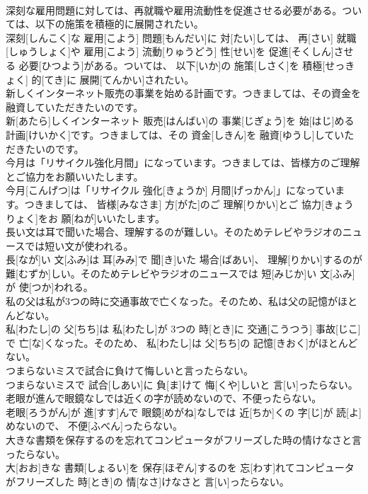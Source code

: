 \documentclass[8pt]{extreport}
\begin{document}
\begin{CJK}{UTF8}{min}
\\	深刻な雇用問題に対しては、再就職や雇用流動性を促進させる必要がある。ついては、以下の施策を積極的に展開されたい。	
\\	深刻[しんこく]な 雇用[こよう] 問題[もんだい]に 対[たい]しては、 再[さい] 就職[しゅうしょく]や 雇用[こよう] 流動[りゅうどう] 性[せい]を 促進[そくしん]させる 必要[ひつよう]がある。ついては、 以下[いか]の 施策[しさく]を 積極[せっきょく] 的[てき]に 展開[てんかい]されたい。
\\	新しくインターネット販売の事業を始める計画です。つきましては、その資金を融資していただきたいのです。	
\\	新[あたら]しくインターネット 販売[はんばい]の 事業[じぎょう]を 始[はじ]める 計画[けいかく]です。つきましては、その 資金[しきん]を 融資[ゆうし]していただきたいのです。
\\	今月は「リサイクル強化月間」になっています。つきましては、皆様方のご理解とご協力をお願いいたします。	
\\	今月[こんげつ]は「リサイクル 強化[きょうか] 月間[げっかん]」になっています。つきましては、 皆様[みなさま] 方[がた]のご 理解[りかい]とご 協力[きょうりょく]をお 願[ねが]いいたします。
\\	長い文は耳で聞いた場合、理解するのが難しい。そのためテレビやラジオのニュースでは短い文が使われる。	
\\	長[なが]い 文[ふみ]は 耳[みみ]で 聞[き]いた 場合[ばあい]、 理解[りかい]するのが 難[むずか]しい。そのためテレビやラジオのニュースでは 短[みじか]い 文[ふみ]が 使[つか]われる。
\\	私の父は私が3つの時に交通事故で亡くなった。そのため、私は父の記憶がほとんどない。	
\\	私[わたし]の 父[ちち]は 私[わたし]が 3つの 時[とき]に 交通[こうつう] 事故[じこ]で 亡[な]くなった。そのため、 私[わたし]は 父[ちち]の 記憶[きおく]がほとんどない。
\\	つまらないミスで試合に負けて悔しいと言ったらない。	
\\	つまらないミスで 試合[しあい]に 負[ま]けて 悔[くや]しいと 言[い]ったらない。
\\	老眼が進んで眼鏡なしでは近くの字が読めないので、不便ったらない。	
\\	老眼[ろうがん]が 進[すす]んで 眼鏡[めがね]なしでは 近[ちか]くの 字[じ]が 読[よ]めないので、 不便[ふべん]ったらない。
\\	大きな書類を保存するのを忘れてコンピュータがフリーズした時の情けなさと言ったらない。	
\\	大[おお]きな 書類[しょるい]を 保存[ほぞん]するのを 忘[わす]れてコンピュータがフリーズした 時[とき]の 情[なさ]けなさと 言[い]ったらない。

\end{CJK}
\end{document}
